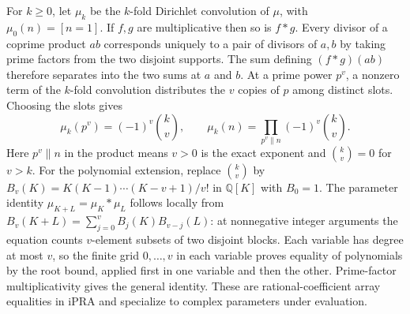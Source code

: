 For $k\ge0$, let $\mu_k$ be the $k$-fold Dirichlet convolution of
$\mu$, with $\mu_0(n)=[n=1]$. If $f,g$ are multiplicative then so is
$f*g$. Every divisor of a coprime product $ab$ corresponds uniquely to
a pair of divisors of $a,b$ by taking prime factors from the two disjoint
supports. The sum defining $(f*g)(ab)$ therefore separates into the two
sums at $a$ and $b$. At a prime power $p^v$, a nonzero term of the
$k$-fold convolution distributes the $v$ copies of $p$ among distinct
slots. Choosing the slots gives
\[
  \mu_k(p^v)=(-1)^v\binom{k}{v},\qquad
  \mu_k(n)=\prod_{p^v\parallel n}(-1)^v\binom{k}{v}.
\]
Here $p^v\parallel n$ in the product means $v>0$ is the exact exponent
and $\binom{k}{v}=0$ for $v>k$. For the polynomial extension, replace
$\binom{k}{v}$ by
$B_v(K)=K(K-1)\cdots(K-v+1)/v!$ in $\mathbb Q[K]$ with $B_0=1$.
The parameter identity $\mu_{K+L}=\mu_K*\mu_L$ follows locally from
$B_v(K+L)=\sum_{j=0}^v B_j(K)B_{v-j}(L)$: at nonnegative integer
arguments the equation counts $v$-element subsets of two disjoint
blocks. Each variable has degree at most $v$, so the finite grid
$0,\ldots,v$ in each variable proves equality of polynomials by the
root bound, applied first in one variable and then the other.
Prime-factor multiplicativity gives the general identity. These are
rational-coefficient array equalities in iPRA and specialize to complex
parameters under evaluation.
